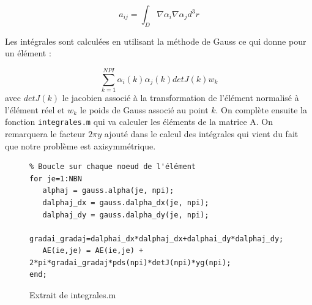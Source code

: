 \documentclass[a4paper,12pt]{article}
\begin{document}
\begin{equation}
 a_{ij} = \int_{D} \nabla \alpha_i \nabla \alpha_j d^3 r 
\end{equation}

\medskip

Les intégrales sont calculées en utilisant la méthode de Gauss ce qui donne pour un élément :

\begin{equation}
\sum_{k=1}^{NPI} \alpha_i (k) \alpha_j (k) detJ(k) w_k
\end{equation}
avec $detJ(k)$ le jacobien associé à la transformation de l'élément normalisé à l'élément réel et $w_k$ le poids de Gauss associé au point $k$. On complète ensuite la fonction \verb|integrales.m| qui va calculer les éléments de la matrice A. On remarquera le facteur $2 \pi y$ ajouté dans le calcul des intégrales qui vient du fait que notre problème est axisymmétrique.

%





%      

%            
%                
%                



%                         
\begin{figure}[h]
\begin{verbatim}
% Boucle sur chaque noeud de l'élément  
for je=1:NBN
   alphaj = gauss.alpha(je, npi);
   dalphaj_dx = gauss.dalpha_dx(je, npi);
   dalphaj_dy = gauss.dalpha_dy(je, npi);
   gradai_gradaj=dalphai_dx*dalphaj_dx+dalphai_dy*dalphaj_dy;
   AE(ie,je) = AE(ie,je) + 2*pi*gradai_gradaj*pds(npi)*detJ(npi)*yg(npi);
end;
\end{verbatim}
\caption{Extrait de integrales.m}
\end{figure}
\end{document}
